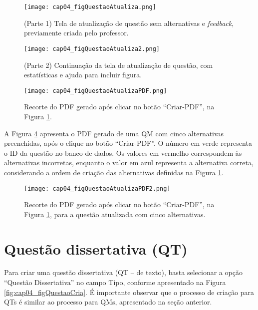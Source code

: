 \begin{figure}[!ht]
  \centering
  \texttt{[image: cap04\_figQuestaoAtualiza.png]}
  \caption{(Parte 1) Tela de atualização de questão sem alternativas e \textit{feedback}, previamente criada pelo professor.}
  \label{fig:cap04_figQuestaoAtualiza}
\end{figure}

\begin{figure}[!ht]
  \centering
  \texttt{[image: cap04\_figQuestaoAtualiza2.png]}
  \caption{(Parte 2) Continuação da tela de atualização de questão, com estatísticas e ajuda para incluir figura.}
  \label{fig:cap04_figQuestaoAtualiza2}
\end{figure}

\begin{figure}[!ht]
  \texttt{[image: cap04\_figQuestaoAtualizaPDF.png]}
  \caption{Recorte do PDF gerado após clicar no botão ``Criar-PDF'', na Figura \ref{fig:cap04_figQuestaoAtualiza}.}
  \label{fig:cap04_figQuestaoAtualizaPDF}
\end{figure}

A Figura \ref{fig:cap04_figQuestaoAtualizaPDF2} apresenta o PDF gerado de uma QM com cinco alternativas preenchidas, após o clique no botão ``Criar-PDF''. O número em verde representa o ID da questão no banco de dados. Os valores em vermelho correspondem às alternativas incorretas, enquanto o valor em azul representa a alternativa correta, considerando a ordem de criação das alternativas definidas na Figura \ref{fig:cap04_figQuestaoAtualiza}.


\begin{figure}[!ht]
  \texttt{[image: cap04\_figQuestaoAtualizaPDF2.png]}
  \caption{Recorte do PDF gerado após clicar no botão ``Criar-PDF'', na Figura \ref{fig:cap04_figQuestaoAtualiza}, para a questão atualizada com cinco alternativas.}
  \label{fig:cap04_figQuestaoAtualizaPDF2}
\end{figure}


\section{Questão dissertativa (QT)}\label{sec:introducaoTextoQT}

Para criar uma questão dissertativa (QT -- de texto), basta selecionar a opção ``Questão Dissertativa'' no campo Tipo, conforme apresentado na Figura \ref{fig:cap04_figQuestaoCria}. É importante observar que o processo de criação para QTs é similar ao processo para QMs, apresentado na seção anterior.

